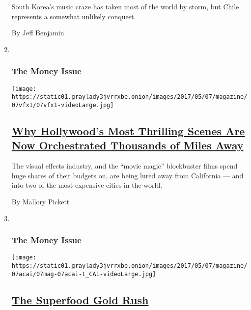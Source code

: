 \begin{enumerate}
  South Korea's music craze has taken most of the world by storm, but
  Chile represents a somewhat unlikely conquest.

  By Jeff Benjamin
\item ~
  \hypertarget{the-money-issue-7}{%
  \subsubsection{The Money Issue}\label{the-money-issue-7}}

  \texttt{[image: https://static01.graylady3jvrrxbe.onion/images/2017/05/07/magazine/07vfx1/07vfx1-videoLarge.jpg]}

  \hypertarget{why-hollywoods-most-thrilling-scenes-are-now-orchestrated-thousands-of-miles-away}{%
  \subsection{\texorpdfstring{\href{/2017/05/04/magazine/why-hollywoods-most-thrilling-scenes-are-now-orchestrated-thousands-of-miles-away.html}{Why
  Hollywood's Most Thrilling Scenes Are Now Orchestrated Thousands of
  Miles
  Away}}{Why Hollywood's Most Thrilling Scenes Are Now Orchestrated Thousands of Miles Away}}\label{why-hollywoods-most-thrilling-scenes-are-now-orchestrated-thousands-of-miles-away}}

  The visual effects industry, and the ``movie magic'' blockbuster films
  spend huge shares of their budgets on, are being lured away from
  California --- and into two of the most expensive cities in the world.

  By Mallory Pickett
\item ~
  \hypertarget{the-money-issue-8}{%
  \subsubsection{The Money Issue}\label{the-money-issue-8}}

  \texttt{[image: https://static01.graylady3jvrrxbe.onion/images/2017/05/07/magazine/07acai/07mag-07acai-t\_CA1-videoLarge.jpg]}

  \hypertarget{the-superfood-gold-rush}{%
  \subsection{\texorpdfstring{\href{/2017/05/02/magazine/the-superfood-gold-rush.html}{The
  Superfood Gold
  Rush}}{The Superfood Gold Rush}}\label{the-superfood-gold-rush}}


\end{enumerate}
